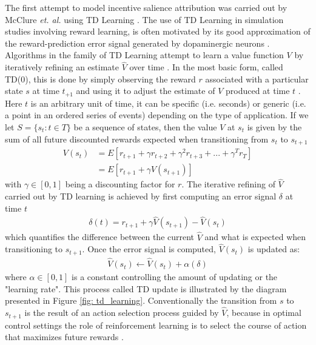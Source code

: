 The first attempt to model incentive salience attribution was carried out by McClure \textit{et. al.} using TD Learning \cite{mcclure2003computational}. The use of TD Learning in simulation studies involving reward learning, is often motivated by its good approximation of the reward-prediction error signal generated by dopaminergic neurons \cite{schultz1997neural,flagel2011selective}. Algorithms in the family of TD Learning attempt to learn a value function $V$ by iteratively refining an estimate $\widehat{V}$ over time \cite{sutton2018reinforcement}. In the most basic form, called TD(0), this is done by simply observing the reward $r$ associated with a particular state $s$ at time $t_{+1}$ and using it to adjust the estimate of $V$ produced at time $t$ \cite{sutton2018reinforcement}. Here $t$ is an arbitrary unit of time, it can be specific (i.e. seconds) or generic (i.e. a point in an ordered series of events) depending on the type of application. If we let $S=\{s_{t}: t \in T\}$ be a sequence of states, then the value $V$  at $s_{t}$ is given by the sum of all future discounted rewards expected when transitioning from $s_t$ to $s_{t+1}$
\begin{align}
\label{td_v}
    V(s_t) 
        &= E[
            r_{t+1} + 
            \gamma r_{t+2} + 
            \gamma^{2} r_{t+3} +
            ... +
            \gamma^{T} r_{T}
        ]\\
        &= E[
            r_{t+1} + 
            \gamma V(s_{t+1}) 
        ] \nonumber
\end{align}
with $\gamma \in [0, 1]$ being a discounting factor for $r$. The iterative refining of $\widehat{V}$ carried out by TD learning is achieved by first computing an error signal $\delta$ at time $t$
\begin{align}
    \label{td_error}
    \delta(t) = r_{t+1} + \gamma \widehat{V}(s_{t+1}) - \widehat{V}(s_{t})
\end{align}
which quantifies the difference between the current $\widehat{V}$ and what is expected when transitioning to $s_{t+1}$. Once the error signal is computed, $\widehat{V}(s_{t})$ is updated as: 
\begin{align}
    \label{td_update}
    \widehat{V}(s_t)  \leftarrow \widehat{V}(s_t) + \alpha(\delta)
\end{align}
where $\alpha \in [0, 1]$ is a constant controlling the amount of updating or the "learning rate". This process called TD update is illustrated by the diagram presented in Figure \ref{fig: td_learning}. Conventionally the transition from $s$ to $s_{t+1}$ is the result of an action selection process guided by $\widehat{V}$, because in optimal control settings the role of reinforcement learning is to select the course of action that maximizes future rewards \cite{schultz1997neural,mcclure2003computational,sutton2018reinforcement}.

